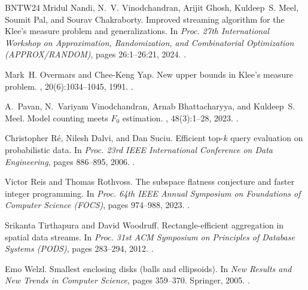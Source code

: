 \documentclass[11pt]{article}
\begin{document}
\begin{thebibliography}{BNTW24}
Mridul Nandi, N.~V. Vinodchandran, Arijit Ghosh, Kuldeep~S. Meel, Soumit Pal,
  and Sourav Chakraborty.
\newblock Improved streaming algorithm for the {K}lee's measure problem and
  generalizations.
\newblock In {\em Proc. 27th International Workshop on Approximation,
  Randomization, and Combinatorial Optimization (APPROX/RANDOM)}, pages
  26:1--26:21, 2024.
\newblock \href {https://doi.org/10.4230/LIPIcs.APPROX/RANDOM.2024.26}
  {}.

Mark~H. Overmars and Chee-Keng Yap.
\newblock New upper bounds in {K}lee’s measure problem.
, 20(6):1034--1045, 1991.
\newblock \href {https://doi.org/10.1137/0220065} {}.

A.~Pavan, N.~Variyam Vinodchandran, Arnab Bhattacharyya, and Kuldeep~S. Meel.
\newblock Model counting meets {$F_0$} estimation.
, 48(3):1--28, 2023.
\newblock \href {https://doi.org/10.1145/3603496} {}.

Christopher R{\' e}, Nilesh Dalvi, and Dan Suciu.
\newblock Efficient top-$k$ query evaluation on probabilistic data.
\newblock In {\em Proc. 23rd IEEE International Conference on Data
  Engineering}, pages 886--895, 2006.
\newblock \href {https://doi.org/10.1109/ICDE.2007.367934}
  {}.

Victor Reis and Thomas Rothvoss.
\newblock The subspace flatness conjecture and faster integer programming.
\newblock In {\em Proc. 64th {IEEE} Annual Symposium on Foundations of Computer
  Science (FOCS)}, pages 974--988, 2023.
\newblock \href {https://doi.org/10.1109/FOCS57990.2023.00060}
  {}.

Srikanta Tirthapura and David Woodruff.
\newblock Rectangle-efficient aggregation in spatial data streams.
\newblock In {\em Proc. 31st ACM Symposium on Principles of Database Systems
  (PODS)}, pages 283--294, 2012.
\newblock \href {https://doi.org/10.1145/2213556.2213595}
  {}.

Emo Welzl.
\newblock Smallest enclosing disks (balls and ellipsoids).
\newblock In {\em New Results and New Trends in Computer Science}, pages
  359--370. Springer, 2005.
\newblock \href {https://doi.org/10.1007/BFb0038202}
  {}.


\end{thebibliography}
\end{document}
